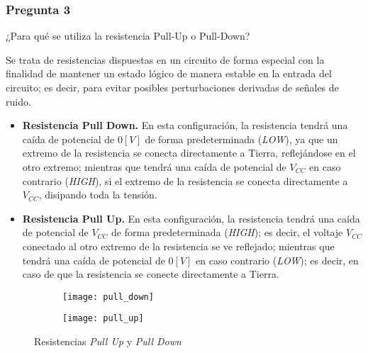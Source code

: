 \documentclass[../procedimientos.tex]{subfiles}
\begin{document}
\subsubsection*{Pregunta 3}
\begin{em}
  ¿Para qué se utiliza la resistencia Pull-Up o Pull-Down?
\end{em}
Se trata de resistencias dispuestas en un circuito de forma especial con la 
finalidad de mantener un estado lógico de manera estable en la entrada del 
circuito; es decir, para evitar posibles perturbaciones derivadas de señales 
de ruido.
\begin{itemize}
  \item \textbf{Resistencia Pull Down.} En esta configuración, la resistencia 
    tendrá una caída de potencial de $0 [V]$ de forma predeterminada 
    (\textit{LOW}), ya que un extremo de la resistencia se conecta 
    directamente a Tierra, reflejándose en el otro extremo; mientras que 
    tendrá una caída de potencial de $V_{CC}$ en caso contrario 
    (\textit{HIGH}), si el extremo de la resistencia se conecta directamente a 
    $V_{CC}$, disipando toda la tensión.
  \item \textbf{Resistencia Pull Up.} En esta configuración, la resistencia  
    tendrá una caída de potencial de $V_{CC}$ de forma predeterminada 
    (\textit{HIGH}); es decir, el voltaje $V_{CC}$ conectado al otro extremo 
    de la resistencia se ve reflejado; mientras que tendrá una caída de 
    potencial de $0[V]$ en caso contrario (\textit{LOW}); es decir, en caso de 
    que la resistencia se conecte directamente a Tierra.
\end{itemize}

\begin{figure}[H]
  \centering
  \begin{subfigure}[b]{0.45\textwidth}
    \centering
    \texttt{[image: pull\_down]}
  \end{subfigure}
  \hfill
  \begin{subfigure}[b]{0.45\textwidth}
    \centering
    \texttt{[image: pull\_up]}
  \end{subfigure}
  \caption{Resistencias \textit{Pull Up} y \textit{Pull Down}}
\end{figure}
\end{document}
